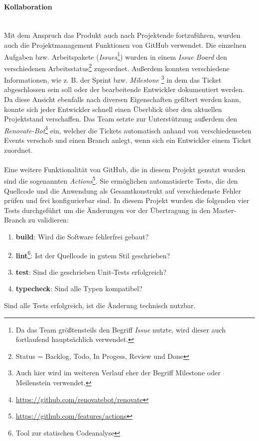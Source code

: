 \documentclass[10pt, a4paper]{article}
\begin{document}
\paragraph{Kollaboration} $~$ \\
Mit dem Anspruch das Produkt auch nach Projektende fortzuführen, wurden auch die Projektmanagement Funktionen von GitHub verwendet. Die einzelnen Aufgaben bzw. Arbeitspakete (\textit{Issues}\footnote{Da das Team größtensteils den Begriff \textit{Issue} nutzte, wird dieser auch fortlaufend hauptsächlich verwendet.}) wurden in einem \textit{Issue Board} den verschiedenen Arbeitsstatus\footnote{Status = Backlog, Todo, In Progess, Review und Done}
zugeordnet. Außerdem konnten verschiedene Informationen, wie z. B. der Sprint bzw. \textit{Milestone} \footnote{Auch hier wird im weiteren Verlauf eher der Begriff Milestone oder Meilenstein verwendet.} in dem das Ticket abgeschlossen sein soll oder der bearbeitende Entwickler dokumentiert werden.
Da diese Ansicht ebenfalls nach diversen Eigenschaften gefiltert werden kann, konnte sich jeder Entwickler schnell einen Überblick über den aktuellen Projektstand verschaffen.
Das Team setzte zur Unterstützung außerdem den \textit{Renovate-Bot}\footnote{\raggedright\url{https://github.com/renovatebot/renovate}} ein, welcher die Tickets automatisch anhand von verschiedenseten Events verschob und einen Branch anlegt, wenn sich ein Entwickler einem Ticket zuordnet.
\\~\\
Eine weitere Funktionalität von GitHub, die in diesem Projekt genutzt wurden sind die sogenannten \textit{Actions}\footnote{\raggedright\url{https://github.com/features/actions}}.
Sie ermöglichen automatisierte Tests, die den Quellcode und die Anwendung als Gesamtkonstrukt auf verschiedenste Fehler prüfen und frei konfigurierbar sind.
In diesem Projekt wurden die folgenden vier Tests durchgeführt um die Änderungen vor der Übertragung in den Master-Branch zu validieren:
\begin{enumerate}
  \item \textbf{build}: Wird die Software fehlerfrei gebaut?
  \item \textbf{lint}\footnote{Tool zur statischen Codeanalyse}: Ist der Quellcode in gutem Stil geschrieben?
  \item \textbf{test}: Sind die geschrieben Unit-Tests erfolgreich?
  \item \textbf{typecheck}: Sind alle Typen kompatibel?
\end{enumerate}
Sind alle Tests erfolgreich, ist die Änderung technisch nutzbar.
\end{document}

